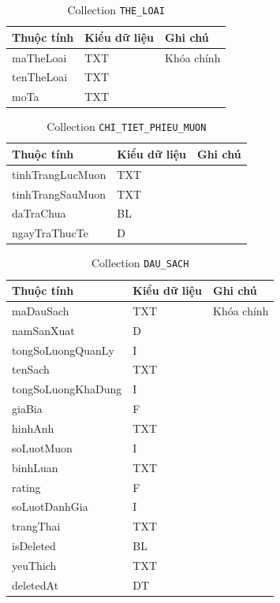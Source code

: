 \documentclass[../main.tex]{subfiles}
\begin{document}
\begin{longtable}{|p{5.7cm}|p{2.4cm}|p{5.2cm}|}
\caption{Collection \texttt{THE\_LOAI}}\\
\hline
\textbf{Thuộc tính} & \textbf{Kiểu dữ liệu} & \textbf{Ghi chú} \\
\hline
maTheLoai & TXT & Khóa chính \\
\hline
tenTheLoai & TXT &  \\
\hline
moTa & TXT &  \\
\hline
\end{longtable}

\begin{longtable}{|p{5.7cm}|p{2.4cm}|p{5.2cm}|}
\caption{Collection \texttt{CHI\_TIET\_PHIEU\_MUON}}\\
\hline
\textbf{Thuộc tính} & \textbf{Kiểu dữ liệu} & \textbf{Ghi chú} \\
\hline
tinhTrangLucMuon & TXT &  \\
\hline
tinhTrangSauMuon & TXT &  \\
\hline
daTraChua & BL &  \\
\hline
ngayTraThucTe & D &  \\
\hline
\end{longtable}

\begin{longtable}{|p{5.7cm}|p{2.4cm}|p{5.2cm}|}
\caption{Collection \texttt{DAU\_SACH}}\\
\hline
\textbf{Thuộc tính} & \textbf{Kiểu dữ liệu} & \textbf{Ghi chú} \\
\hline
maDauSach & TXT & Khóa chính \\
\hline
namSanXuat & D &  \\
\hline
tongSoLuongQuanLy & I &  \\
\hline
tenSach & TXT &  \\
\hline
tongSoLuongKhaDung & I &  \\
\hline
giaBia & F &  \\
\hline
hinhAnh & TXT &  \\
\hline
soLuotMuon & I &  \\
\hline
binhLuan & TXT &  \\
\hline
rating & F &  \\
\hline
soLuotDanhGia & I &  \\
\hline
trangThai & TXT &  \\
\hline
isDeleted & BL &  \\
\hline
yeuThich & TXT &  \\
\hline
deletedAt & DT &  \\
\hline
\end{longtable}
\end{document}
